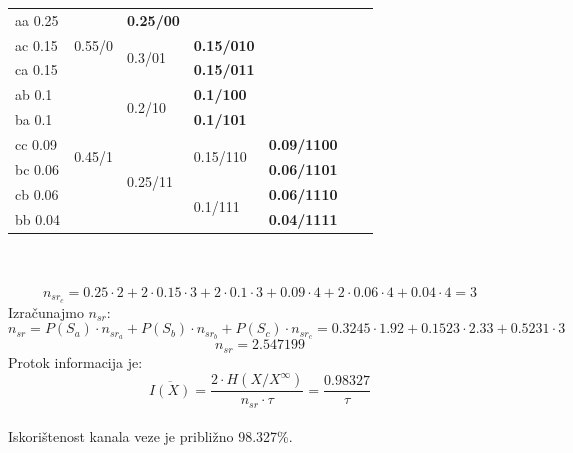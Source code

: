 \documentclass[12pt]{article}
\begin{document}
\begin{enumerate}
\begin{tabular}{|l|l|l|llll}
\cline{1-3}
aa 0.25 & \multirow{3}{*}{0.55/0} & \textbf{0.25/00} &  &  &  &  \\ \cline{1-1} \cline{3-4}
ac 0.15 &  & \multirow{2}{*}{0.3/01} & \multicolumn{1}{l|}{\textbf{0.15/010}} &  &  &  \\ \cline{1-1} \cline{4-4}
ca 0.15 &  &  & \multicolumn{1}{l|}{\textbf{0.15/011}} &  &  &  \\ \cline{1-4}
ab 0.1 & \multirow{6}{*}{0.45/1} & \multirow{2}{*}{0.2/10} & \multicolumn{1}{l|}{\textbf{0.1/100}} &  &  &  \\ \cline{1-1} \cline{4-4}
ba 0.1 &  &  & \multicolumn{1}{l|}{\textbf{0.1/101}} &  &  &  \\ \cline{1-1} \cline{3-5}
cc 0.09 &  & \multirow{4}{*}{0.25/11} & \multicolumn{1}{l|}{\multirow{2}{*}{0.15/110}} & \multicolumn{1}{l|}{\textbf{0.09/1100}} &  &  \\ \cline{1-1} \cline{5-5}
bc 0.06 &  &  & \multicolumn{1}{l|}{} & \multicolumn{1}{l|}{\textbf{0.06/1101}} &  &  \\ \cline{1-1} \cline{4-5}
cb 0.06 &  &  & \multicolumn{1}{l|}{\multirow{2}{*}{0.1/111}} & \multicolumn{1}{l|}{\textbf{0.06/1110}} &  &  \\ \cline{1-1} \cline{5-5}
bb 0.04 &  &  & \multicolumn{1}{l|}{} & \multicolumn{1}{l|}{\textbf{0.04/1111}} &  &  \\ \cline{1-5}
\end{tabular}
\\
\\
\begin{equation*}
    n_{sr_{c}} = 0.25\cdot2 + 2\cdot0.15\cdot3 + 2\cdot0.1\cdot3 + 0.09\cdot4 + 2\cdot0.06\cdot4 + 0.04\cdot4=3
\end{equation*}	
\newpage
Izračunajmo $n_{sr}$:
 \begin{equation*}
     n_{sr} = P(S_a) \cdot n_{sr_{a}} + P(S_b) \cdot n_{sr_{b}} + P(S_c) \cdot n_{sr_{c}} = 0.3245\cdot1.92 + 0.1523\cdot2.33 + 0.5231\cdot3
 \end{equation*}
 \begin{equation*}
     n_{sr} = 2.547199   
 \end{equation*}
 Protok informacija je:
 \begin{equation*}
    \overline{I(X)} = \frac{2 \cdot H(X/X^\infty)}{n_{sr} \cdot \tau} = \frac{0.98327}{\tau}
\end{equation*}
\\
Iskorištenost kanala veze je približno 98.327\%. \\

\end{enumerate}
\end{document}
